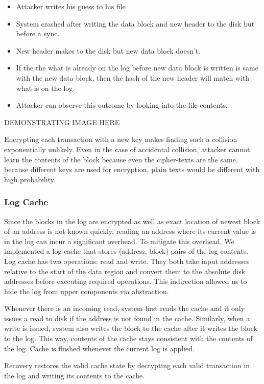\begin{itemize}
    \item Attacker writes his guess to his file
    \item System crashed after writing the data block and new header to the disk but before a sync.
    \item New header makes to the disk but new data block doesn't.
    \item If the the what is already on the log before new data block is written is same with the new data block, then the hash of the new header will match with what is on the log.
    \item Attacker can observe this outcome by looking into the file contents.
\end{itemize}

{\color{red} DEMONSTRATING IMAGE HERE}

Encrypting each transaction with a new key makes finding such a collision exponentially unlikely. Even in the case of accidental collision, attacker cannot learn the contents of the block because even the cipher-texts are the same, because different keys are used for encryption, plain texts would be different with high probability.

\subsubsection*{Log Cache}
Since the blocks in the log are encrypted as well as exact location of newest block of an address is not known quickly, reading an address where its current value is in the log can incur a significant overhead. To mitigate this overhead, We implemented a log cache that stores (address, block) pairs of the log contents. Log cache has two operations: read and write. They both take input addresses relative to the start of the data region and convert them to the absolute disk addresses before executing required operations. This indirection allowed us to hide the log from upper components via abstraction.

Whenever there is an incoming read, system first reads the cache and it only issues a read to disk if the address is not found in the cache. Similarly, when a write is issued, system also writes the block to the cache after it writes the block to the log. This way, contents of the cache stays consistent with the contents of the log. Cache is flushed whenever the current log is applied.

Recovery restores the valid cache state by decrypting each valid transaction in the log and writing its contents to the cache.

